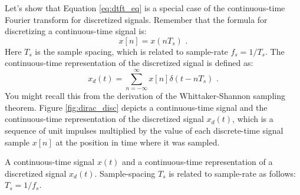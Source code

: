 Let's show that Equation \ref{eq:dtft_eq} is a special case of the
continuous-time Fourier transform for discretized signals. Remember
that the formula for discretizing a continuous-time signal is:
\begin{equation}
x[n] = x(nT_s)\,\,.%
\end{equation}
Here $T_s$ is the sample spacing, which is related to sample-rate
$f_s=1/T_s$. The continuous-time representation of the discretized
signal is defined as:
\begin{equation}
x_d(t) = \sum_{n=-\infty}^{\infty} x[n] \delta(t-n T_s) \,\,.
\end{equation}
You might recall this from the derivation of the Whittaker-Shannon
sampling theorem. Figure \ref{fig:dirac_disc} depicts a
continuous-time signal and the continuous-time representation of the
discretized signal $x_d(t)$, which is a sequence of unit impulses
multiplied by the value of each discrete-time signal sample $x[n]$ at
the position in time where it was sampled.
\begin{marginfigure}[-3cm]
\begin{center}
\end{center}
\caption{A continuous-time signal $x(t)$ and a continuous-time representation of a discretized signal $x_d(t)$. Sample-spacing $T_s$ is related to sample-rate as follows: $T_s = 1/f_s$.}
\label{fig:dirac_disc}
\end{marginfigure}

